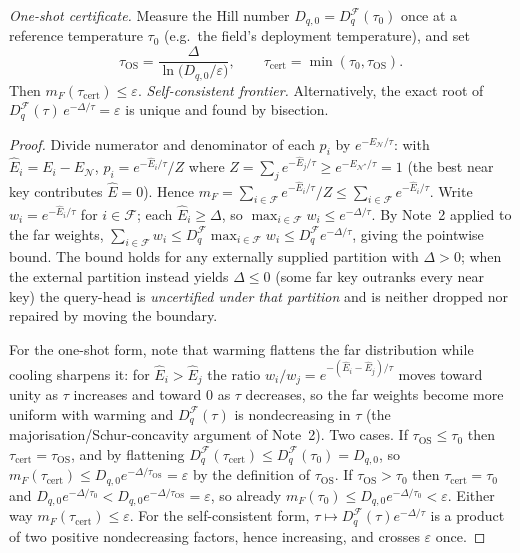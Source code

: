 \documentclass[10pt,twocolumn]{article}
\begin{document}
\emph{One-shot certificate.} Measure the Hill number $D_{q,0}=D_q^{\mathcal{F}}(\tau_0)$ once at a reference temperature $\tau_0$ (e.g.\ the field's deployment temperature), and set
\begin{equation}
\tau_{\mathrm{OS}}=\frac{\Delta}{\ln\!\big(D_{q,0}/\varepsilon\big)},\qquad \tau_{\mathrm{cert}}=\min(\tau_0,\tau_{\mathrm{OS}}).
\end{equation}
Then $m_F(\tau_{\mathrm{cert}})\le\varepsilon$. \emph{Self-consistent frontier.} Alternatively, the exact root of $D_q^{\mathcal{F}}(\tau)\,e^{-\Delta/\tau}=\varepsilon$ is unique and found by bisection.
\begin{proof}
Divide numerator and denominator of each $p_i$ by $e^{-E_{\mathcal N}/\tau}$: with $\hat E_i=E_i-E_{\mathcal N}$, $p_i=e^{-\hat E_i/\tau}/Z$ where $Z=\sum_j e^{-\hat E_j/\tau}\ge e^{-\hat E_{\mathcal N^\star}/\tau}=1$ (the best near key contributes $\hat E=0$). Hence $m_F=\sum_{i\in\mathcal{F}}e^{-\hat E_i/\tau}/Z\le\sum_{i\in\mathcal{F}}e^{-\hat E_i/\tau}$. Write $w_i=e^{-\hat E_i/\tau}$ for $i\in\mathcal{F}$; each $\hat E_i\ge\Delta$, so $\max_{i\in\mathcal{F}}w_i\le e^{-\Delta/\tau}$. By Note~2 applied to the far weights, $\sum_{i\in\mathcal{F}}w_i\le D_q^{\mathcal{F}}\max_{i\in\mathcal{F}}w_i\le D_q^{\mathcal{F}}e^{-\Delta/\tau}$, giving the pointwise bound. The bound holds for any externally supplied partition with $\Delta>0$; when the external partition instead yields $\Delta\le0$ (some far key outranks every near key) the query-head is \emph{uncertified under that partition} and is neither dropped nor repaired by moving the boundary.

For the one-shot form, note that warming flattens the far distribution while cooling sharpens it: for $\hat E_i>\hat E_j$ the ratio $w_i/w_j=e^{-(\hat E_i-\hat E_j)/\tau}$ moves toward unity as $\tau$ increases and toward $0$ as $\tau$ decreases, so the far weights become more uniform with warming and $D_q^{\mathcal{F}}(\tau)$ is nondecreasing in $\tau$ (the majorisation/Schur-concavity argument of Note~2). Two cases. If $\tau_{\mathrm{OS}}\le\tau_0$ then $\tau_{\mathrm{cert}}=\tau_{\mathrm{OS}}$, and by flattening $D_q^{\mathcal{F}}(\tau_{\mathrm{cert}})\le D_q^{\mathcal{F}}(\tau_0)=D_{q,0}$, so $m_F(\tau_{\mathrm{cert}})\le D_{q,0}e^{-\Delta/\tau_{\mathrm{OS}}}=\varepsilon$ by the definition of $\tau_{\mathrm{OS}}$. If $\tau_{\mathrm{OS}}>\tau_0$ then $\tau_{\mathrm{cert}}=\tau_0$ and $D_{q,0}e^{-\Delta/\tau_0}<D_{q,0}e^{-\Delta/\tau_{\mathrm{OS}}}=\varepsilon$, so already $m_F(\tau_0)\le D_{q,0}e^{-\Delta/\tau_0}<\varepsilon$. Either way $m_F(\tau_{\mathrm{cert}})\le\varepsilon$. For the self-consistent form, $\tau\mapsto D_q^{\mathcal{F}}(\tau)e^{-\Delta/\tau}$ is a product of two positive nondecreasing factors, hence increasing, and crosses $\varepsilon$ once.
\end{proof}
\end{document}
